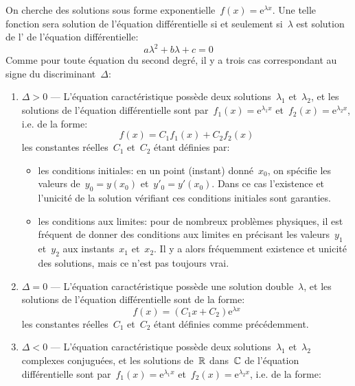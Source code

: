 On cherche des solutions sous forme exponentielle~$f(x) = \mathrm{e}^{\lambda x}$. Une telle fonction sera solution de l'équation différentielle si et seulement si~$\lambda$ est solution de l' de l'équation différentielle:
\begin{equation}
a\lambda^2 + b\lambda + c = 0
\end{equation}
Comme pour toute équation du second degré, il y a trois cas correspondant au signe du discriminant~$\Delta$:
\begin{enumerate}
\item$\Delta>0$ --- L'équation caractéristique possède deux solutions~$\lambda_1$ et~$\lambda_2$, et les solutions de l'équation différentielle sont  par~$f_1(x) = \mathrm{e}^{\lambda_1x}$ et~$f_2(x) = \mathrm{e}^{\lambda_2x}$, i.e. de la forme:
\begin{equation}
f(x) = C_1f_1(x) + C_2f_2(x)
\end{equation}
les constantes réelles~$C_1$ et~$C_2$ étant définies par: 
\begin{itemize} 
\item les conditions initiales: en un point (instant) donné~$x_0$, on spécifie les valeurs de~$y_0=y(x_0)$ et~$y'_0=y'(x_0)$. Dans ce cas l'existence et l'unicité de la solution vérifiant ces conditions initiales sont garanties. 
\item les conditions aux limites: pour de nombreux problèmes physiques, il est fréquent de donner des conditions aux limites en précisant les valeurs~$y_1$et~$y_2$ aux instants~$x_1$ et~$x_2$. Il y a alors fréquemment existence et unicité des solutions, mais ce n'est pas toujours vrai. 
\end{itemize} 
\item$\Delta=0$ --- L'équation caractéristique possède une solution double~$\lambda$, et les solutions de l'équation différentielle sont de la forme:
\begin{equation}
f(x) = (C_1 x + C_2)\mathrm{e}^{\lambda x}
\end{equation}
les constantes réelles~$C_1$ et~$C_2$ étant définies comme précédemment. 
\item$\Delta<0$ --- L'équation caractéristique possède deux solutions~$\lambda_1$ et~$\lambda_2$ complexes conjuguées, et les solutions de~$\mathbb R$ dans~$\mathbb C$ de l'équation différentielle sont  par~$f_1(x) = \mathrm{e}^{\lambda_1x}$ et~$f_2(x) = \mathrm{e}^{\lambda_2x}$, i.e. de la forme:
\begin{equation}

\end{equation}
\end{enumerate}
